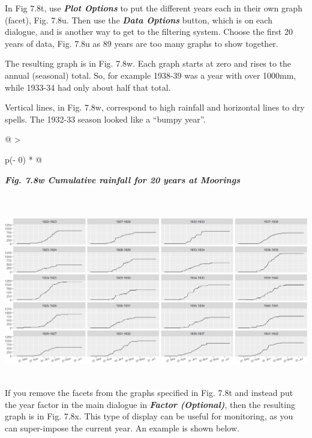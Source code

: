 \documentclass[
  letterpaper,
  DIV=11,
  numbers=noendperiod]{scrreprt}
\begin{document}
In Fig 7.8t, use \textbf{\emph{Plot Options}} to put the different years
each in their own graph (facet), Fig. 7.8u. Then use the
\textbf{\emph{Data Options}} button, which is on each dialogue, and is
another way to get to the filtering system. Choose the first 20 years of
data, Fig. 7.8u as 89 years are too many graphs to show together.

The resulting graph is in Fig. 7.8w. Each graph starts at zero and rises
to the annual (seasonal) total. So, for example 1938-39 was a year with
over 1000mm, while 1933-34 had only about half that total.

Vertical lines, in Fig. 7.8w, correspond to high rainfall and horizontal
lines to dry spells. The 1932-33 season looked like a ``bumpy year''.

\begin{longtable}[]{@{}
  >{\raggedright\arraybackslash}p{(\columnwidth - 0\tabcolsep) * }@{}}
\toprule\noalign{}
\begin{minipage}[b]{\linewidth}\raggedright
\textbf{\emph{Fig. 7.8w Cumulative rainfall for 20 years at Moorings}}
\end{minipage} \\
\midrule\noalign{}
\endhead
\bottomrule\noalign{}
\endlastfoot
\includegraphics[width=6.00661in,height=2.94408in]{figures/Fig7.8w.png} \\
\end{longtable}

If you remove the facets from the graphs specified in Fig. 7.8t and
instead put the year factor in the main dialogue in \textbf{\emph{Factor
(Optional)}}, then the resulting graph is in Fig. 7.8x. This type of
display can be useful for monitoring, as you can super-impose the
current year. An example is shown below.
\end{document}
